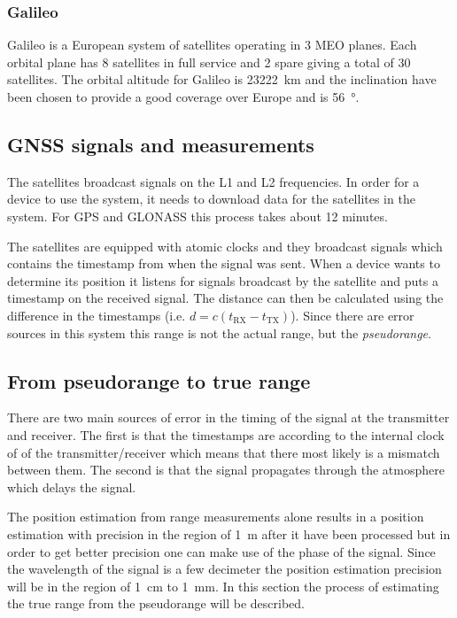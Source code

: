 \documentclass[12pt,a4paper]{article}
\begin{document}
\subsubsection{Galileo}
Galileo is a European system of satellites operating in 3 MEO planes.
Each orbital plane has 8 satellites in full service and 2 spare giving a total of 30 satellites.
The orbital altitude for Galileo is \SI{23222}{\kilo\metre} and the inclination have been chosen to provide a good coverage over Europe and is \SI{56}{\degree}.

\subsection{GNSS signals and measurements}
The satellites broadcast signals on the L1 and L2 frequencies.
In order for a device to use the system, it needs to download data for the satellites in the system.
For GPS and GLONASS this process takes about 12 minutes.

The satellites are equipped with atomic clocks and they broadcast signals which contains the timestamp from when the signal was sent.
When a device wants to determine its position it listens for signals broadcast by the satellite and puts a timestamp on the received signal.
The distance can then be calculated using the difference in the timestamps (i.e. $d=c(t_{\text{RX}}-t_{\text{TX}})$).
Since there are error sources in this system this range is not the actual range, but the \textit{pseudorange}.

\subsection{From pseudorange to true range}\label{sec:pseudorange}
There are two main sources of error in the timing of the signal at the transmitter and receiver.
The first is that the timestamps are according to the internal clock of of the transmitter/receiver which means that there most likely is a mismatch between them.
The second is that the signal propagates through the atmosphere which delays the signal.

The position estimation from range measurements alone results in a position estimation with precision in the region of \SI{1}{\metre} after it have been processed but in order to get better precision one can make use of the phase of the signal.
Since the wavelength of the signal is a few decimeter the position estimation precision will be in the region of \SI{1}{\centi\metre} to \SI{1}{\milli\metre}.
In this section the process of estimating the true range from the pseudorange will be described.\\
\end{document}
